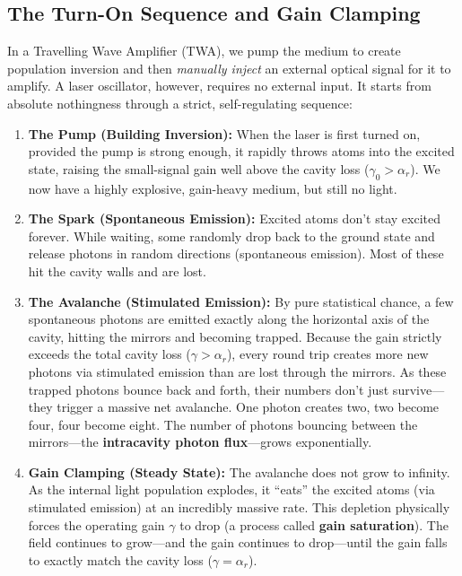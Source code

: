 \subsection{The Turn-On Sequence and Gain Clamping}

In a Travelling Wave Amplifier (TWA), we pump the medium to create population inversion and then \textit{manually inject} an external optical signal for it to amplify. A laser oscillator, however, requires no external input. It starts from absolute nothingness through a strict, self-regulating sequence:

\begin{enumerate}
    \item \textbf{The Pump (Building Inversion):} When the laser is first turned on, provided the pump is strong enough, it rapidly throws atoms into the excited state, raising the small-signal gain well above the cavity loss ($\gamma_0 > \alpha_r$). We now have a highly explosive, gain-heavy medium, but still no light.

    \item \textbf{The Spark (Spontaneous Emission):} Excited atoms don't stay excited forever. While waiting, some randomly drop back to the ground state and release photons in random directions (spontaneous emission). Most of these hit the cavity walls and are lost.

    \item \textbf{The Avalanche (Stimulated Emission):} By pure statistical chance, a few spontaneous photons are emitted exactly along the horizontal axis of the cavity, hitting the mirrors and becoming trapped. Because the gain strictly exceeds the total cavity loss ($\gamma > \alpha_r$), every round trip creates more new photons via stimulated emission than are lost through the mirrors. As these trapped photons bounce back and forth, their numbers don't just survive---they trigger a massive net avalanche. One photon creates two, two become four, four become eight. The number of photons bouncing between the mirrors---the \textbf{intracavity photon flux}---grows exponentially.

    \item \textbf{Gain Clamping (Steady State):} The avalanche does not grow to infinity. As the internal light population explodes, it ``eats'' the excited atoms (via stimulated emission) at an incredibly massive rate. This depletion physically forces the operating gain $\gamma$ to drop (a process called \textbf{gain saturation}). The field continues to grow---and the gain continues to drop---until the gain falls to exactly match the cavity loss ($\gamma = \alpha_r$).
\end{enumerate}

